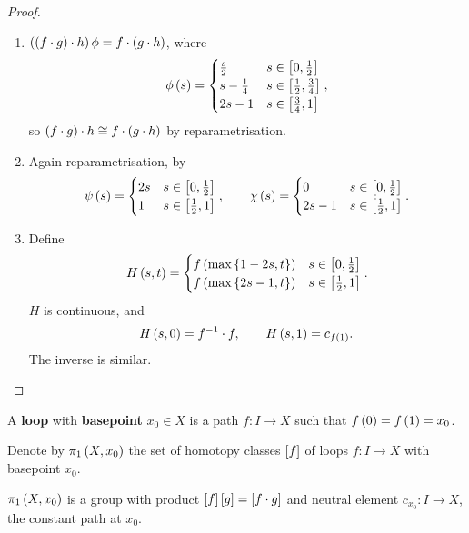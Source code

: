 \begin{proof}
\hfill
\begin{enumerate}
\item $ \rb{\rb{f \cdot g} \cdot h}\phi = f \cdot \rb{g \cdot h} $, where
$$ \phi\rb{s} =
\begin{cases}
\tfrac{s}{2} & s \in \sb{0, \tfrac{1}{2}} \\
s - \tfrac{1}{4} & s \in \sb{\tfrac{1}{2}, \tfrac{3}{4}} \\
2s - 1 & s \in \sb{\tfrac{3}{4}, 1}
\end{cases},
$$
so $ \rb{f \cdot g} \cdot h \cong f \cdot \rb{g \cdot h} $ by reparametrisation.
\item Again reparametrisation, by
$$ \psi\rb{s} =
\begin{cases}
2s & s \in \sb{0, \tfrac{1}{2}} \\
1 & s \in \sb{\tfrac{1}{2}, 1}
\end{cases},
\qquad \chi\rb{s} =
\begin{cases}
0 & s \in \sb{0, \tfrac{1}{2}} \\
2s - 1 & s \in \sb{\tfrac{1}{2}, 1}
\end{cases}.
$$
\item Define
$$ H\rb{s, t} =
\begin{cases}
f\rb{\max\cb{1 - 2s, t}} & s \in \sb{0, \tfrac{1}{2}} \\
f\rb{\max\cb{2s - 1, t}} & s \in \sb{\tfrac{1}{2}, 1}
\end{cases}.
$$
$ H $ is continuous, and
$$ H\rb{s, 0} = f^{-1} \cdot f, \qquad H\rb{s, 1} = c_{f\rb{1}}. $$
The inverse is similar.
\end{enumerate}
\end{proof}

\begin{definition*}
A \textbf{loop} with \textbf{basepoint} $ x_0 \in X $ is a path $ f : I \to X $ such that $ f\rb{0} = f\rb{1} = x_0 $.
\end{definition*}

\begin{definition*}
Denote by $ \pi_1\rb{X, x_0} $ the set of homotopy classes $ \sb{f} $ of loops $ f : I \to X $ with basepoint $ x_0 $.
\end{definition*}

\begin{proposition}
$ \pi_1\rb{X, x_0} $ is a group with product $ \sb{f}\sb{g} = \sb{f \cdot g} $ and neutral element $ c_{x_0} : I \to X $, the constant path at $ x_0 $.
\end{proposition}

